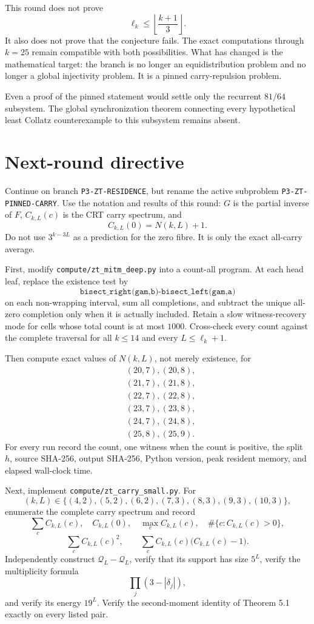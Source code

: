 \documentclass[11pt]{article}
\theoremstyle{remark}
\newcommand{\Qset}{\mathcal{Q}}
\begin{document}
This round does not prove
\[
\ell_k\le\left\lfloor\frac{k+1}{3}\right\rfloor.
\]
It also does not prove that the conjecture fails.  The exact computations through \(k=25\) remain compatible with both possibilities.  What has changed is the mathematical target: the branch is no longer an equidistribution problem and no longer a global injectivity problem.  It is a pinned carry-repulsion problem.

Even a proof of the pinned statement would settle only the recurrent \(81/64\) subsystem.  The global synchronization theorem connecting every hypothetical least Collatz counterexample to this subsystem remains absent.

\section{Next-round directive}

Continue on branch \texttt{P3-ZT-RESIDENCE}, but rename the active subproblem \texttt{P3-ZT-PINNED-CARRY}.  Use the notation and results of this round: \(G\) is the partial inverse of \(F\), \(C_{k,L}(c)\) is the CRT carry spectrum, and
\[
C_{k,L}(0)=N(k,L)+1.
\]
Do not use \(3^{k-3L}\) as a prediction for the zero fibre.  It is only the exact all-carry average.

First, modify \texttt{compute/zt\_mitm\_deep.py} into a count-all program.  At each head leaf, replace the existence test by
\[
\texttt{bisect\_right(gam,b)-bisect\_left(gam,a)}
\]
on each non-wrapping interval, sum all completions, and subtract the unique all-zero completion only when it is actually included.  Retain a slow witness-recovery mode for cells whose total count is at most \(1000\).  Cross-check every count against the complete traversal for all \(k\le14\) and every \(L\le\ell_k+1\).

Then compute exact values of \(N(k,L)\), not merely existence, for
\[
\begin{aligned}
&(20,7),(20,8),\\
&(21,7),(21,8),\\
&(22,7),(22,8),\\
&(23,7),(23,8),\\
&(24,7),(24,8),\\
&(25,8),(25,9).
\end{aligned}
\]
For every run record the count, one witness when the count is positive, the split \(h\), source SHA-256, output SHA-256, Python version, peak resident memory, and elapsed wall-clock time.

Next, implement \texttt{compute/zt\_carry\_small.py}.  For
\[
(k,L)\in
\{(4,2),(5,2),(6,2),(7,3),(8,3),(9,3),(10,3)\},
\]
enumerate the complete carry spectrum and record
\[
\sum_cC_{k,L}(c),
\quad
C_{k,L}(0),
\quad
\max_cC_{k,L}(c),
\quad
\#\{c:C_{k,L}(c)>0\},
\]
\[
\sum_cC_{k,L}(c)^2,
\qquad
\sum_cC_{k,L}(c)\bigl(C_{k,L}(c)-1\bigr).
\]
Independently construct \(\Qset_L-\Qset_L\), verify that its support has size \(5^L\), verify the multiplicity formula
\[
\prod_j(3-|\delta_j|),
\]
and verify its energy \(19^L\).  Verify the second-moment identity of Theorem 5.1 exactly on every listed pair.
\end{document}
